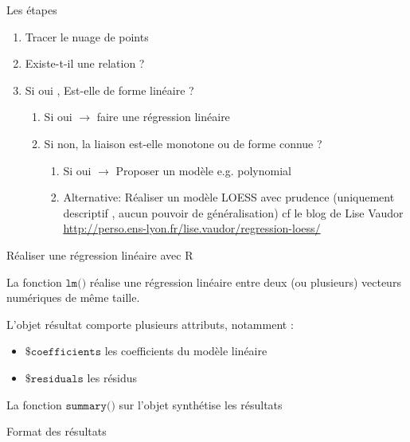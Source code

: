 \documentclass{beamer}
\begin{document}
\begin{frame}{Les étapes}

\begin{enumerate}
  \item Tracer le nuage de points
  \item Existe-t-il une relation ? 
  \item Si oui , Est-elle de forme linéaire ? 
  \begin{enumerate}
  \item Si oui  $\rightarrow$ faire une \alert{régression linéaire} 
   \item Si non, la liaison est-elle monotone ou de forme connue ?
   \begin{enumerate}
   \item Si oui $\rightarrow$  Proposer un \alert{modèle} e.g. polynomial
   \item Alternative: Réaliser un modèle \alert{LOESS} avec prudence (uniquement descriptif , aucun pouvoir de généralisation) cf le blog de Lise Vaudor \url{http://perso.ens-lyon.fr/lise.vaudor/regression-loess/}
\end{enumerate}
\end{enumerate}
\end{enumerate}


\end{frame}







\begin{frame}{Réaliser une régression linéaire avec R}


La fonction $\texttt{lm()}$ réalise une régression linéaire entre deux (ou plusieurs) vecteurs numériques de même taille.


L'objet résultat comporte plusieurs attributs, notamment : 

\begin{itemize}
  \item $\texttt{\$coefficients}$ les coefficients du modèle linéaire
  \item  $\texttt{\$residuals}$ les résidus 
\end{itemize}


La fonction $\texttt{summary()}$ sur l'objet synthétise les résultats 


\end{frame}



\begin{frame}{Format des résultats}





\end{frame}
\end{document}
